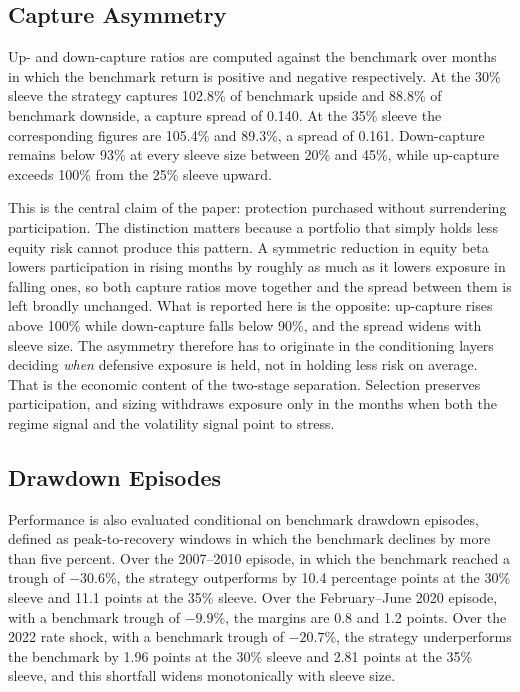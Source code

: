 \documentclass[11pt, a4paper]{article}
\begin{document}
\subsection{Capture Asymmetry}

Up- and down-capture ratios are computed against the benchmark over months in which the
benchmark return is positive and negative respectively. At the 30\% sleeve the strategy
captures 102.8\% of benchmark upside and 88.8\% of benchmark downside, a capture spread of
0.140. At the 35\% sleeve the corresponding figures are 105.4\% and 89.3\%, a spread of 0.161.
Down-capture remains below 93\% at every sleeve size between 20\% and 45\%, while up-capture
exceeds 100\% from the 25\% sleeve upward.

This is the central claim of the paper: protection purchased without surrendering
participation. The distinction matters because a portfolio that simply holds less equity risk
cannot produce this pattern. A symmetric reduction in equity beta lowers participation in
rising months by roughly as much as it lowers exposure in falling ones, so both capture ratios
move together and the spread between them is left broadly unchanged. What is reported here is
the opposite: up-capture rises above 100\% while down-capture falls below 90\%, and the spread
widens with sleeve size. The asymmetry therefore has to originate in the conditioning layers
deciding \emph{when} defensive exposure is held, not in holding less risk on average. That is
the economic content of the two-stage separation. Selection preserves participation, and sizing
withdraws exposure only in the months when both the regime signal and the volatility signal
point to stress.

\subsection{Drawdown Episodes}

Performance is also evaluated conditional on benchmark drawdown episodes, defined as
peak-to-recovery windows in which the benchmark declines by more than five percent. Over the
2007--2010 episode, in which the benchmark reached a trough of $-30.6$\%, the strategy
outperforms by 10.4 percentage points at the 30\% sleeve and 11.1 points at the 35\% sleeve.
Over the February--June 2020 episode, with a benchmark trough of $-9.9$\%, the margins are 0.8
and 1.2 points. Over the 2022 rate shock, with a benchmark trough of $-20.7$\%, the strategy
underperforms the benchmark by 1.96 points at the 30\% sleeve and 2.81 points at the 35\%
sleeve, and this shortfall widens monotonically with sleeve size.
\end{document}
